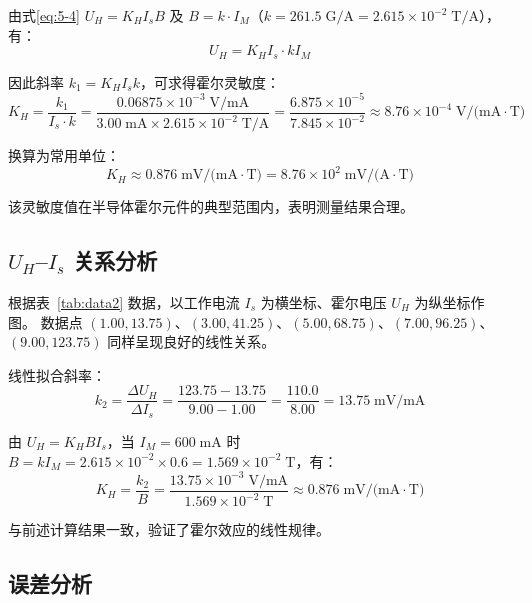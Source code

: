 由式\eqref{eq:5-4} $U_H = K_H I_s B$ 及 $B = k \cdot I_M$（$k = 261.5\;\text{G/A} = 2.615 \times 10^{-2}\;\text{T/A}$），有：
\begin{equation}
    U_H = K_H I_s \cdot k I_M
\end{equation}

因此斜率 $k_1 = K_H I_s k$，可求得霍尔灵敏度：
\begin{equation}
    K_H = \frac{k_1}{I_s \cdot k} = \frac{0.06875 \times 10^{-3}\;\text{V/mA}}{3.00\;\text{mA} \times 2.615 \times 10^{-2}\;\text{T/A}} = \frac{6.875 \times 10^{-5}}{7.845 \times 10^{-2}} \approx 8.76 \times 10^{-4}\;\text{V/(mA}\cdot\text{T)}
\end{equation}

换算为常用单位：
\begin{equation}
    K_H \approx 0.876\;\text{mV/(mA}\cdot\text{T)} = 8.76 \times 10^{2}\;\text{mV/(A}\cdot\text{T)}
\end{equation}

\noindent 该灵敏度值在半导体霍尔元件的典型范围内，表明测量结果合理。

\subsection{$U_H$--$I_s$ 关系分析}

根据表~\ref{tab:data2} 数据，以工作电流 $I_s$ 为横坐标、霍尔电压 $U_H$ 为纵坐标作图。
数据点 $(1.00, 13.75)$、$(3.00, 41.25)$、$(5.00, 68.75)$、$(7.00, 96.25)$、$(9.00, 123.75)$ 同样呈现良好的线性关系。

线性拟合斜率：
\begin{equation}
    k_2 = \frac{\Delta U_H}{\Delta I_s} = \frac{123.75 - 13.75}{9.00 - 1.00} = \frac{110.0}{8.00} = 13.75\;\text{mV/mA}
\end{equation}

由 $U_H = K_H B I_s$，当 $I_M = 600\;\text{mA}$ 时 $B = k I_M = 2.615 \times 10^{-2} \times 0.6 = 1.569 \times 10^{-2}\;\text{T}$，有：
\begin{equation}
    K_H = \frac{k_2}{B} = \frac{13.75 \times 10^{-3}\;\text{V/mA}}{1.569 \times 10^{-2}\;\text{T}} \approx 0.876\;\text{mV/(mA}\cdot\text{T)}
\end{equation}

与前述计算结果一致，验证了霍尔效应的线性规律。

\subsection{误差分析}

